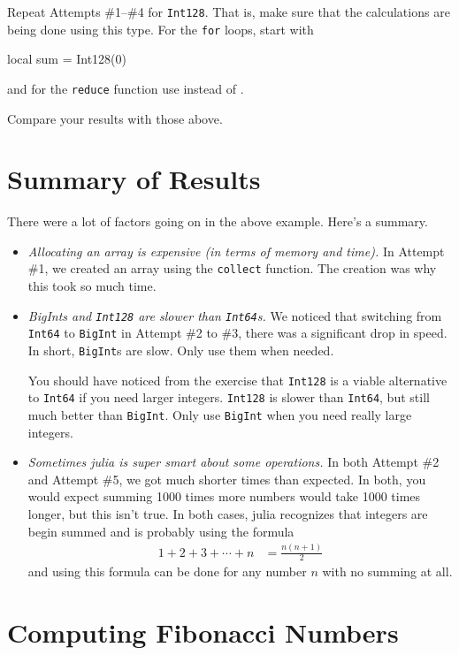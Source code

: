 Repeat Attempts \#1--\#4 for \texttt{Int128}.  That is, make sure that the calculations are being done using this type.  For the \texttt{for} loops, start with 
\begin{jlverbatim}[fastcode]
local sum = Int128(0)
\end{jlverbatim}
and for the \texttt{reduce} function use  instead of .

Compare your results with those above.  

\section{Summary of Results}

There were a lot of factors going on in the above example.  Here's a summary.

\begin{itemize}
\item \emph{Allocating an array is expensive (in terms of memory and time).}  In Attempt \#1, we created an array using the \texttt{collect} function. The creation was why this took so much time. 
\item \emph{BigInts and \texttt{Int128} are slower than \texttt{Int64}s.}   We noticed that switching from \texttt{Int64} to \texttt{BigInt} in Attempt \#2 to \#3, there was a significant drop in speed.  In short, \texttt{BigInt}s are slow.  Only use them when needed.  

You should have noticed from the exercise that \texttt{Int128} is a viable alternative to \texttt{Int64} if you need larger integers.  \texttt{Int128} is slower than \texttt{Int64}, but still much better than \texttt{BigInt}.  Only use \texttt{BigInt} when you need really large integers. 

\item \emph{Sometimes julia is super smart about some operations.}  In both Attempt \#2 and Attempt \#5, we got much shorter times than expected.  In both, you would expect summing 1000 times more numbers would take 1000 times longer, but this isn't true.  In both cases, julia recognizes that integers are begin summed and is probably using the formula
\begin{align*}
1+2+3 + \cdots + n & = \frac{n(n+1)}{2}
\end{align*}
and using this formula can be done for any number $n$ with no summing at all. 
\end{itemize}

\section{Computing Fibonacci Numbers} \label{sect:faster:fibonacci}

